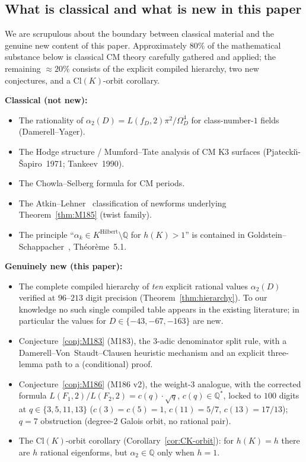 \documentclass[12pt]{amsart}
\theoremstyle{definition}
\newcommand{\Q}{\mathbb{Q}}
\begin{document}
\subsection{What is classical and what is new in this paper}

We are scrupulous about the boundary between classical material and the
genuine new content of this paper. Approximately $80\%$ of the
mathematical substance below is classical CM theory carefully gathered
and applied; the remaining $\approx 20\%$ consists of the explicit
compiled hierarchy, two new conjectures, and a Cl$(K)$-orbit
corollary.

\medskip
\noindent\textbf{Classical (not new):}
\begin{itemize}[leftmargin=2em]
  \item The rationality of $\alpha_2(D) = L(f_D,2)\pi^2/\Omega_D^4$ for
        class-number-$1$ fields (Damerell--Yager).
  \item The Hodge structure / Mumford--Tate analysis of CM K3 surfaces
        (Pjatecki\u{\i}-\v{S}apiro~1971; Tankeev~1990).
  \item The Chowla--Selberg formula for CM periods.
  \item The Atkin--Lehner~\cite{CITE-NEEDED-AtkinLehner1970} classification
        of newforms underlying Theorem~\ref{thm:M185} (twist family).
  \item The principle ``$\alpha_k \in K^{\mathrm{Hilbert}} \setminus \Q$
        for $h(K) > 1$'' is contained in
        Goldstein--Schappacher~\cite{GoldsteinSchappacher1981}, Th\'eor\`eme~5.1.
\end{itemize}

\medskip
\noindent\textbf{Genuinely new (this paper):}
\begin{itemize}[leftmargin=2em]
  \item The complete compiled hierarchy of \emph{ten} explicit rational
        values $\alpha_2(D)$ verified at $96$--$213$ digit precision
        (Theorem~\ref{thm:hierarchy}). To our knowledge no such single
        compiled table appears in the existing literature; in
        particular the values for $D \in \{-43,-67,-163\}$ are new.
  \item Conjecture~\ref{conj:M183} (M183), the $3$-adic denominator split
        rule, with a Damerell--Von~Staudt--Clausen heuristic mechanism and
        an explicit three-lemma path to a (conditional) proof.
  \item Conjecture~\ref{conj:M186} (M186 v2), the weight-$3$ analogue, with
        the corrected formula $L(F_1,2)/L(F_2,2)=c(q)\cdot\sqrt{q}$,
        $c(q)\in\Q^*$, locked to $100$ digits at $q\in\{3,5,11,13\}$
        ($c(3)=c(5)=1$, $c(11)=5/7$, $c(13)=17/13$); $q=7$ obstruction
        (degree-$2$ Galois orbit, no rational pair).
  \item The Cl$(K)$-orbit corollary
        (Corollary~\ref{cor:CK-orbit}): for $h(K) = h$ there are
        $h$ rational eigenforms, but $\alpha_2 \in \Q$ only when $h = 1$.
\end{itemize}
\end{document}

